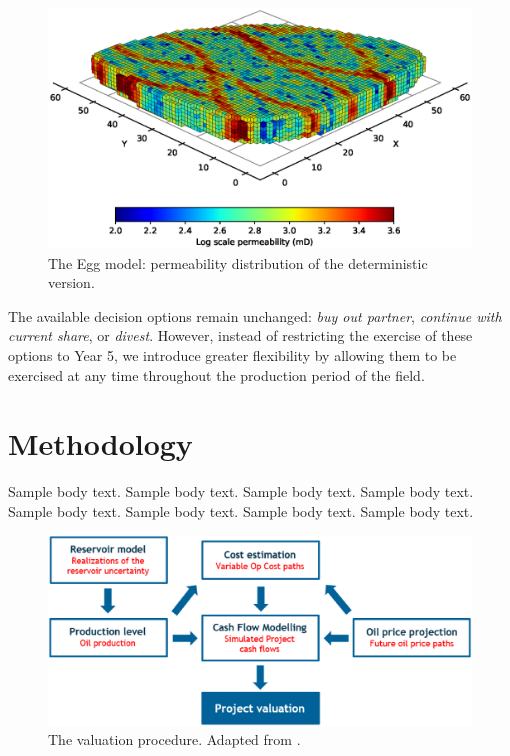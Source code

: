 \documentclass[pdflatex,sn-basic]{sn-jnl}%
\theoremstyle{thmstyleone}%
\theoremstyle{thmstyletwo}%
\theoremstyle{thmstylethree}%
\begin{document}
\begin{figure}[H]
\centering
\begin{minipage}{0.95\textwidth}
  \includegraphics[width=\textwidth]{egg_model_log_3D.eps}
  \caption{The Egg model: permeability distribution of the deterministic version.}
  \label{fig1}
\end{minipage}
\end{figure}

The available decision options remain unchanged: \textit{buy out partner}, \textit{continue with current share}, or \textit{divest}. However, instead of restricting the exercise of these options to Year 5, we introduce greater flexibility by allowing them to be exercised at any time throughout the production period of the field.


\section{Methodology}\label{sec4}

Sample body text. Sample body text. Sample body text. Sample body text. Sample body text. Sample body text. Sample body text. Sample body text.

\begin{figure}[H]
\centering
\begin{minipage}{0.95\textwidth}
  \includegraphics[width=\textwidth]{valuation.eps}
  \caption{The valuation procedure. Adapted from \cite{ref22}.}
  \label{fig2}
\end{minipage}
\end{figure}
\end{document}
